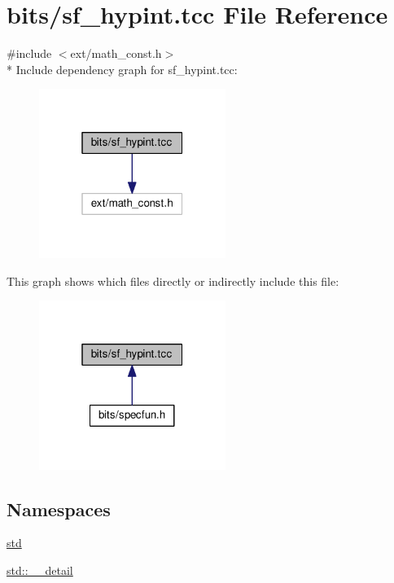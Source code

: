 \hypertarget{sf__hypint_8tcc}{}\section{bits/sf\+\_\+hypint.tcc File Reference}
\label{sf__hypint_8tcc}
{\ttfamily \#include $<$ext/math\+\_\+const.\+h$>$}\\*
Include dependency graph for sf\+\_\+hypint.\+tcc\+:
\nopagebreak
\begin{figure}[H]
\begin{center}
\leavevmode
\includegraphics[width=172pt]{sf__hypint_8tcc__incl}
\end{center}
\end{figure}
This graph shows which files directly or indirectly include this file\+:
\nopagebreak
\begin{figure}[H]
\begin{center}
\leavevmode
\includegraphics[width=172pt]{sf__hypint_8tcc__dep__incl}
\end{center}
\end{figure}
\subsection*{Namespaces}
\begin{DoxyCompactItemize}
\item 
 \hyperlink{namespacestd}{std}
\item 
 \hyperlink{namespacestd_1_1____detail}{std\+::\+\_\+\+\_\+detail}
\end{DoxyCompactItemize}
